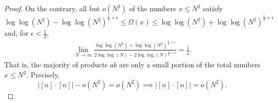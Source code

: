 \documentclass[12pt,reqno]{amsart}
\begin{document}
\begin{proof}
On the contrary, all but \(o(N^{2})\) of the numbers \(x \leq N^{2}\) satisfy
\[
    \log\log \left( N^{2} \right) - \log\log \left( N^{2} \right) ^{\frac{1}{2} + \epsilon} \leq \Omega(x) \leq \log\log \left( N^{2} \right) + \log\log \left( N^{2} \right) ^{\frac{1}{2} + \epsilon} 
\]
and, for \(\epsilon < \frac{1}{2} \),
\begin{align*}
\lim_{N \to \infty} \frac{\log\log \left( N^{2} \right) + \log\log \left( N^{2} \right) ^{\frac{1}{2} + \epsilon}}{2 \log\log \left( N \right) - 2 \log\log \left( N \right) ^{\frac{1}{2} +\epsilon}} = \frac{1}{2}.
\end{align*}
That is, the majority of products \(ab\) are only a small portion of the total numbers
\(x \leq N^{2}\). Precisely,
\[
    \left\lvert [n] \cdot [n] \right\rvert - o(N^{2}) = o(N^{2}) \implies \left\lvert [n] \cdot [n] \right\rvert = o(N^{2})
.\]

\end{proof}
\end{document}
